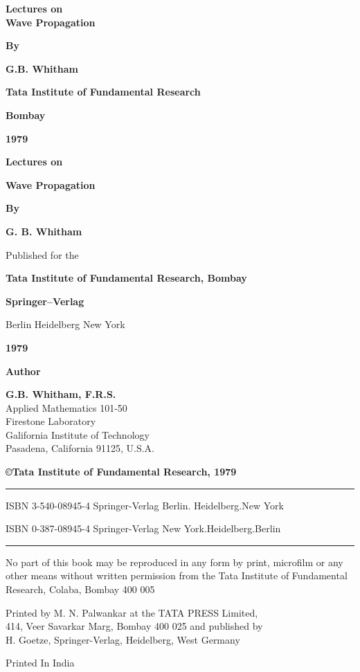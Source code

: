 \thispagestyle{empty}
\begin{center}
{\Large\bf Lectures on}\\[5pt]
{\Large\bf Wave Propagation}
\vfill

{\bf By}
\medskip

{\large\bf G.B. Whitham}
\vfill

{\bf Tata Institute of Fundamental Research}
\medskip

{\bf Bombay}
\medskip

{\bf 1979}
\end{center}

\eject

\thispagestyle{empty}
\begin{center}
{\Large\bf Lectures on}
\medskip

{\Large\bf Wave Propagation}\\
\vfill

{\bf By}\\
\medskip

{\large\bf G. B. Whitham}
\vfill

Published for the
\medskip

{\bf Tata Institute of Fundamental Research, Bombay}
\medskip

{\bf Springer--Verlag}
\medskip

Berlin Heidelberg New York
\medskip

{\bf 1979}
\end{center}

\eject

\thispagestyle{empty}

\begin{center}
{\Large\bf Author}
\medskip

{\large\bf G.B. Whitham, F.R.S.}\\
Applied Mathematics 101-50\\
Firestone Laboratory\\
Galifornia Institute of Technology\\
Pasadena, California 91125, U.S.A.
\vfill

{\bf\copyright \quad Tata Institute of Fundamental Research, 1979}
\vfill

\noindent\rule{\textwidth}{1pt}

ISBN 3-540-08945-4 Springer-Verlag Berlin. Heidelberg.New York

ISBN 0-387-08945-4 Springer-Verlag New York.Heidelberg.Berlin

\noindent\rule{\textwidth}{1pt}
\vfill

\parbox{0.7\textwidth}{%
No part of this book may be reproduced in any form
by print, microfilm or any other means without written
permission from the Tata Institute of Fundamental
Research, Colaba, Bombay 400 005}
\vfill

Printed by M. N. Palwankar at the TATA PRESS Limited,\\
414, Veer Savarkar Marg, Bombay  400 025 and published by\\ H. Goetze,
Springer-Verlag, Heidelberg, West Germany\\
\vfill

Printed In India
\end{center}

